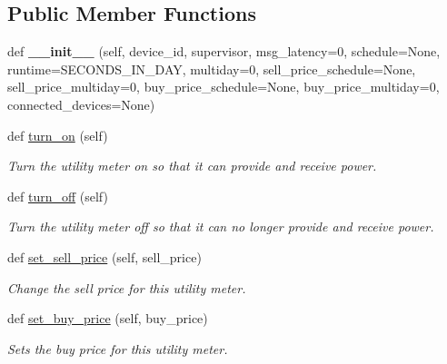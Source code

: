 \subsection*{Public Member Functions}
\begin{DoxyCompactItemize}
\item 
\mbox{\label{class_build_1_1_objects_1_1utility__meter_1_1_utility_meter_a641edf1c1c911d9e2cffe710d139782c}} 
def {\bfseries \+\_\+\+\_\+init\+\_\+\+\_\+} (self, device\+\_\+id, supervisor, msg\+\_\+latency=0, schedule=None, runtime=S\+E\+C\+O\+N\+D\+S\+\_\+\+I\+N\+\_\+\+D\+AY, multiday=0, sell\+\_\+price\+\_\+schedule=None, sell\+\_\+price\+\_\+multiday=0, buy\+\_\+price\+\_\+schedule=None, buy\+\_\+price\+\_\+multiday=0, connected\+\_\+devices=None)
\item 
def \hyperlink{class_build_1_1_objects_1_1utility__meter_1_1_utility_meter_a426b005fc2ad0ce41094d80e324a251f}{turn\+\_\+on} (self)
\begin{DoxyCompactList}\small\item\em Turn the utility meter on so that it can provide and receive power. \end{DoxyCompactList}\item 
def \hyperlink{class_build_1_1_objects_1_1utility__meter_1_1_utility_meter_a33fc2489dff8710a37e6067238f30305}{turn\+\_\+off} (self)
\begin{DoxyCompactList}\small\item\em Turn the utility meter off so that it can no longer provide and receive power. \end{DoxyCompactList}\item 
def \hyperlink{class_build_1_1_objects_1_1utility__meter_1_1_utility_meter_a3fddd94d0a6ca8646c64a5684e447e0d}{set\+\_\+sell\+\_\+price} (self, sell\+\_\+price)
\begin{DoxyCompactList}\small\item\em Change the sell price for this utility meter. \end{DoxyCompactList}\item 
def \hyperlink{class_build_1_1_objects_1_1utility__meter_1_1_utility_meter_a251bb69419a9885a8e867d8b5932c044}{set\+\_\+buy\+\_\+price} (self, buy\+\_\+price)
\begin{DoxyCompactList}\small\item\em Sets the buy price for this utility meter. \end{DoxyCompactList}\item 

\end{DoxyCompactItemize}
